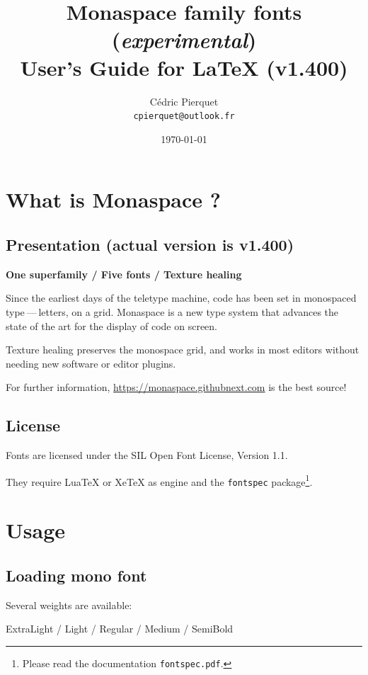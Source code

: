 \documentclass[a4paper]{scrartcl}
\title{Monaspace family fonts (\textit{experimental}) \\User’s Guide for LaTeX (v1.400)}
\author{Cédric Pierquet \\ \texttt{cpierquet@outlook.fr}}
\date{\today}
\newcommand*{\pkg}[1]{\texttt{#1}}
\newcommand*{\file}[1]{\texttt{#1}}
\begin{document}
\maketitle

\section{What is Monaspace ?}

\subsection{Presentation (actual version is v1.400)}

\textbf{One superfamily / Five fonts / Texture healing}

Since the earliest days of the teletype machine, code has been set in monospaced type — letters, on a grid. Monaspace is a new type system that advances the state of the art for the display of code on screen.

Texture healing preserves the monospace grid, and works in most editors without needing new software or editor plugins.

\medskip

For further information, \url{https://monaspace.githubnext.com} is the best source!

\subsection{License}

Fonts are licensed under the SIL Open Font License, Version 1.1.

They require LuaTeX or XeTeX as engine and the \pkg{fontspec} package\footnote{Please read the documentation \file{fontspec.pdf}.}.

\pagebreak

\section{Usage}

\subsection{Loading mono font}

Several weights are available:

\hfill{\monaspaceargonextralight ExtraLight} / {\monaspaceargonlight Light} / {\monaspaceargon Regular} / {\monaspaceargonmedium Medium} / {\monaspaceargonsemibold SemiBold}\hfill\null
\end{document}
